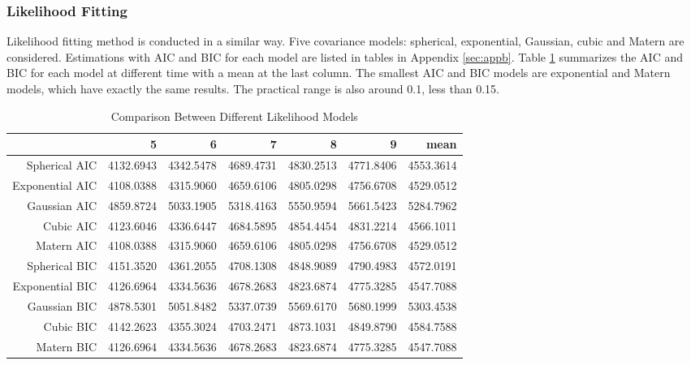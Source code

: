 \documentclass[hidelinks,12pt]{article}
\begin{document}
	\subsubsection{Likelihood Fitting}
	Likelihood fitting method is conducted in a similar way. Five covariance models: spherical, exponential, Gaussian, cubic and Matern are considered. Estimations with AIC and BIC for each model are listed in tables in Appendix \ref{sec:appb}. Table \ref{tbl:complik} summarizes the AIC and BIC for each model at different time with a mean at the last column. The smallest AIC and BIC models are exponential and Matern models, which have exactly the same results. The practical range is also around 0.1, less than 0.15.
	\begin{table}[ht]
		\centering
		\caption{Comparison Between Different Likelihood Models \label{tbl:complik}}
		\begin{tabular}{rrrrrrr}
			\hline
			& 5 & 6 & 7 & 8 & 9 & mean \\ 
			\hline
			Spherical AIC & 4132.6943 & 4342.5478 & 4689.4731 & 4830.2513 & 4771.8406 & 4553.3614 \\ 
			Exponential AIC & 4108.0388 & 4315.9060 & 4659.6106 & 4805.0298 & 4756.6708 & 4529.0512 \\ 
			Gaussian AIC & 4859.8724 & 5033.1905 & 5318.4163 & 5550.9594 & 5661.5423 & 5284.7962 \\ 
			Cubic AIC & 4123.6046 & 4336.6447 & 4684.5895 & 4854.4454 & 4831.2214 & 4566.1011 \\ 
			Matern AIC & 4108.0388 & 4315.9060 & 4659.6106 & 4805.0298 & 4756.6708 & 4529.0512 \\ 
			Spherical BIC & 4151.3520 & 4361.2055 & 4708.1308 & 4848.9089 & 4790.4983 & 4572.0191 \\ 
			Exponential BIC & 4126.6964 & 4334.5636 & 4678.2683 & 4823.6874 & 4775.3285 & 4547.7088 \\ 
			Gaussian BIC & 4878.5301 & 5051.8482 & 5337.0739 & 5569.6170 & 5680.1999 & 5303.4538 \\ 
			Cubic BIC & 4142.2623 & 4355.3024 & 4703.2471 & 4873.1031 & 4849.8790 & 4584.7588 \\ 
			Matern BIC & 4126.6964 & 4334.5636 & 4678.2683 & 4823.6874 & 4775.3285 & 4547.7088 \\ 
			\hline
		\end{tabular}
	\end{table}
	
\end{document}
